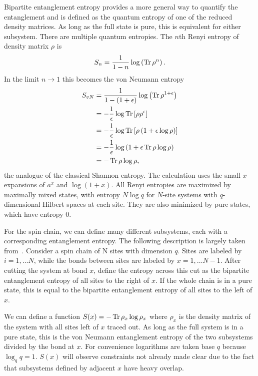 Bipartite entanglement entropy provides a more general way to quantify the entanglement and is defined as the quantum entropy of one of the reduced density matrices. As long as the full state is pure, this is equivalent for either subsystem. There are multiple quantum entropies. The $n$th Renyi entropy of density matrix $\rho$ is 
\begin{align}
S_n = \frac{1}{1-n}\log\left(\operatorname{Tr}\rho^n\right). \label{eqn:renyi}
\end{align}
In the limit $n\to1$ this becomes the von Neumann entropy 
\begin{align}
S_{vN} &= \frac{1}{1-(1+\epsilon)}\log\left(\operatorname{Tr}\rho^{1+\epsilon}\right) \nonumber\\
&= -\frac{1}{\epsilon}\log \operatorname{Tr} \left[\rho \rho^{\epsilon}\right]\nonumber\\
&= -\frac{1}{\epsilon}\log\operatorname{Tr}\left[\rho\left(1+\epsilon\log\rho\right)\right] \nonumber\\
&= -\frac{1}{\epsilon}\log\left(1+\epsilon\operatorname{Tr}\rho\log\rho\right)\nonumber\\
&= -\operatorname{Tr}\rho\log\rho,
\end{align}
the analogue of the classical Shannon entropy. The calculation uses the small $x$ expansions of $a^x$ and $\log(1+x)$. All Renyi entropies are maximized by maximally mixed states, with entropy $N\log q$ for $N$-site systems with $q$-dimensional Hilbert spaces at each site. They are also minimized by pure states, which have entropy 0.

For the spin chain, we can define many different subsystems, each with a corresponding entanglement entropy. The following description is largely taken from~\cite{Nahum2017}. Consider a spin chain of N sites with dimension $q$. Sites are labeled by $i=1,\dots N$, while the bonds between sites are labeled by $x = 1,\dots N-1$. After cutting the system at bond $x$, define the entropy across this cut as the bipartite entanglement entropy of all sites to the right of $x$. If the whole chain is in a pure state, this is equal to the bipartite entanglement entropy of all sites to the left of $x$.

We can define a function $S(x) = -\operatorname{Tr}\rho_x\log\rho_x$ where $\rho_x$ is the density matrix of the system with all sites left of $x$ traced out. As long as the full system is in a pure state, this is the von Neumann entanglement entropy of the two subsystems divided by the bond at $x$. For convenience logarithms are taken base $q$ because $\log_qq=1$. $S(x)$ will observe constraints not already made clear due to the fact that subsystems defined by adjacent $x$ have heavy overlap.

